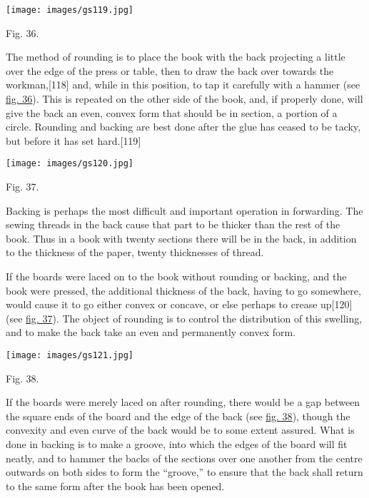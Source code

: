 \documentclass[
]{article}
\begin{document}
\protect\hypertarget{Fig_36}{}{}
\texttt{[image: images/gs119.jpg]}

Fig. 36.

The method of rounding is to place the book with the back projecting a
little over the edge of the press or table, then to draw the back over
towards the workman,{\protect\hypertarget{Page_118}{}{{[}118{]}}} and,
while in this position, to tap it carefully with a hammer (see
\protect\hyperlink{Fig_36}{fig. 36}). This is repeated on the other side
of the book, and, if properly done, will give the back an even, convex
form that should be in section, a portion of a circle. Rounding and
backing are best done after the glue has ceased to be tacky, but before
it has set hard.{\protect\hypertarget{Page_119}{}{{[}119{]}}}

\protect\hypertarget{Fig_37}{}{}
\texttt{[image: images/gs120.jpg]}

Fig. 37.

Backing is perhaps the most difficult and important operation in
forwarding. The sewing threads in the back cause that part to be thicker
than the rest of the book. Thus in a book with twenty sections there
will be in the back, in addition to the thickness of the paper, twenty
thicknesses of thread.

If the boards were laced on to the book without rounding or backing, and
the book were pressed, the additional thickness of the back, having to
go somewhere, would cause it to go either convex or concave, or else
perhaps to crease up{\protect\hypertarget{Page_120}{}{{[}120{]}}} (see
\protect\hyperlink{Fig_37}{fig. 37}). The object of rounding is to
control the distribution of this swelling, and to make the back take an
even and permanently convex form.

\protect\hypertarget{Fig_38}{}{}
\texttt{[image: images/gs121.jpg]}

Fig. 38.

If the boards were merely laced on after rounding, there would be a gap
between the square ends of the board and the edge of the back (see
\protect\hyperlink{Fig_38}{fig. 38}), though the convexity and even
curve of the back would be to some extent assured. What is done in
backing is to make a groove, into which the edges of the board will fit
neatly, and to hammer the backs of the sections over one another from
the centre outwards on both sides to form the ``groove,'' to ensure that
the back shall return to the same form after the book has been opened.
\end{document}
